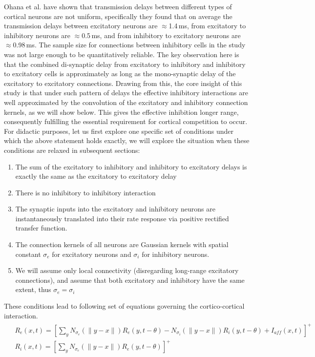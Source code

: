 \documentclass[a4paper,10pt]{article}
\begin{document}
Ohana et al. \cite{Ohana2012} have shown that transmission delays between different types of cortical neurons are not uniform, specifically they found that on average the transmission delays  between excitatory neurons are $\approx$1.4\,ms, from excitatory to inhibitory neurons are $\approx$0.5\,ms, and from inhibitory to excitatory neurons are $\approx$0.98\,ms. The sample size for connections
between inhibitory cells in the study was not large enough to be quantitatively reliable. The key observation here is that the 
combined di-synaptic delay from excitatory to inhibitory and inhibitory to excitatory cells is approximately as long as the mono-synaptic delay
of the excitatory to excitatory connections. Drawing from this, the core insight of this study is that under such pattern of delays
the effective inhibitory interactions are well approximated by the convolution of the excitatory and inhibitory connection kernels, as we will
show below. This gives the effective inhibition longer range, consequently fulfilling the essential requirement for cortical competition to occur.
For didactic purposes, let us first explore one specific set of conditions under which the above statement holds exactly, we will explore the 
situation when these conditions are relaxed in subsequent sections: 

\begin{enumerate}

\item The sum of the excitatory to inhibitory and inhibitory to excitatory delays is exactly the same as the excitatory to excitatory delay
\item There is no inhibitory to inhibitory interaction
\item The synaptic inputs into the excitatory and inhibitory neurons are instantaneously translated into their rate response via positive rectified transfer function.
\item The connection kernels of all neurons are Gaussian kernels with spatial constant $\sigma_{e}$ for excitatory neurons and $\sigma_{i}$ for inhibitory neurons.
\item We will assume only local connectivity (disregarding long-range excitatory connections), and assume that both excitatory and inhibitory have the same extent, thus $\sigma_{e} = \sigma_{i}$ 
\end{enumerate}

These conditions lead to following set of equations governing the cortico-cortical interaction.
\begin{align}
\label{eqn:first}
\begin{split}
& R_{e}(x,t) = [\sum_{y}N_{\sigma_{e}}(\lVert y-x \rVert)R_{e}(y,t-\theta) - N_{\sigma_{i}}(\lVert y-x \rVert)R_{i}(y,t-\theta) + I_{aff}(x,t)]^+ \\
& R_{i}(x,t) = [\sum_{y}N_{\sigma_{e}}(\lVert y-x \rVert)R_{e}(y,t-\theta)]^+
\end{split}
\end{align}
\end{document}
